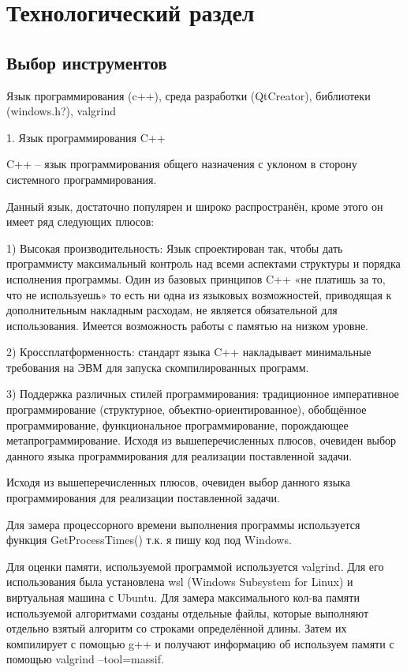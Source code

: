 \chapter{Технологический раздел}
\section{Выбор инструментов}
Язык программирования (c++), среда разработки (QtCreator), библиотеки (windows.h?), valgrind

1.	Язык программирования C++

C++ – язык программирования общего назначения с уклоном в сторону системного программирования. \cite{c++}

Данный язык, достаточно популярен и широко распространён, кроме этого он имеет ряд следующих плюсов:

1)	Высокая производительность: Язык спроектирован так, чтобы дать программисту максимальный контроль над всеми аспектами структуры и порядка исполнения программы. Один из базовых принципов C++ «не платишь за то, что не используешь» то есть ни одна из языковых возможностей, приводящая к дополнительным накладным расходам, не является обязательной для использования. Имеется возможность работы с памятью на низком уровне. 

2)	Кроссплатформенность: стандарт языка C++ накладывает минимальные требования на ЭВМ для запуска скомпилированных программ.

3)	Поддержка различных стилей программирования: традиционное императивное программирование (структурное, объектно-ориентированное), обобщённое программирование, функциональное программирование, порождающее метапрограммирование.
Исходя из вышеперечисленных плюсов, очевиден выбор данного языка программирования для реализации поставленной задачи.

Исходя из вышеперечисленных плюсов, очевиден выбор данного языка программирования для реализации поставленной задачи.

Для замера процессорного времени выполнения программы используется функция GetProcessTimes() т.к. я пишу код под Windows. \cite{get_proccess_times} 

Для оценки памяти, используемой программой используется valgrind. Для его использования была установлена wsl (Windows Subsystem for Linux) и виртуальная машина с Ubuntu. Для замера максимального кол-ва памяти используемой алгоритмами созданы отдельные файлы, которые выполняют отдельно взятый алгоритм со строками определённой длины. Затем их компилирует с помощью g++ и получают информацию об используем памяти с помощью valgrind --tool=massif. \cite{get_memory}


